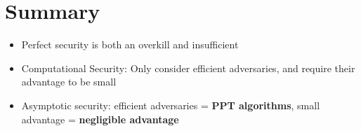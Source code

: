 	\section{Summary}
		\begin{itemize}
			\item Perfect security is both an overkill and insufficient
			\item Computational Security: Only consider efficient adversaries, and require their advantage to be small
			\item Asymptotic security: efficient adversaries = \textbf{PPT algorithms}, small advantage = \textbf{negligible advantage}
		\end{itemize}





































